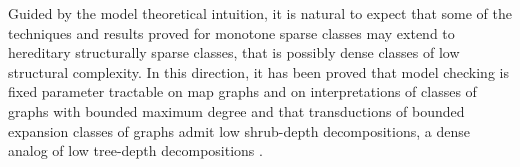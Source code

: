 Guided by the model theoretical intuition, it is natural to expect that some of the techniques and results proved for monotone sparse classes may extend to hereditary structurally sparse classes, that is possibly dense classes of low structural complexity. In this direction, it has been proved that model checking is fixed parameter tractable on map graphs \cite{eickmeyer2017fo} and on interpretations of classes of graphs with bounded maximum degree \cite{gajarsky2016new} and that transductions of bounded expansion classes of graphs admit low shrub-depth decompositions, a dense analog of low tree-depth decompositions \cite{gajarsky2018first}. 

